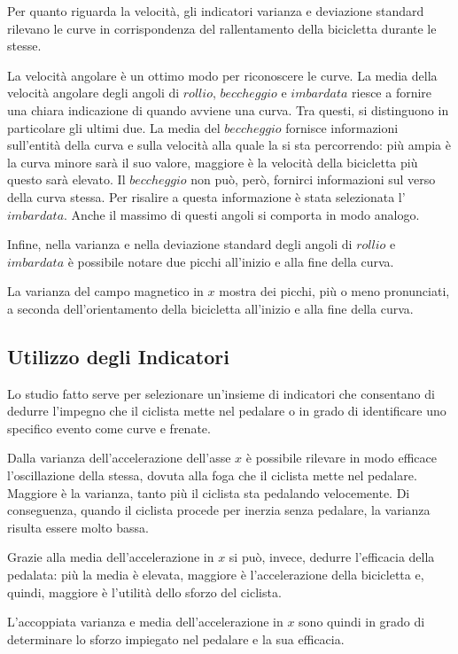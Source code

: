 \documentclass[class=article]{standalone}
\begin{document}
	Per quanto riguarda la velocità, gli indicatori varianza e deviazione standard rilevano le curve in corrispondenza del rallentamento della bicicletta durante le stesse.\hfill\break
	
	La velocità angolare è un ottimo modo per riconoscere le curve. La media della velocità angolare degli angoli di \(rollio\), \(beccheggio\) e \(imbardata\) riesce a fornire una chiara indicazione di quando avviene una curva. Tra questi, si distinguono in particolare gli ultimi due. La media del \(beccheggio\) fornisce informazioni sull'entità della curva e sulla velocità alla quale la si sta percorrendo: più ampia è la curva minore sarà il suo valore, maggiore è la velocità della bicicletta più questo sarà elevato. Il \(beccheggio\) non può, però, fornirci informazioni sul verso della curva stessa. Per risalire a questa informazione è stata selezionata l'\(imbardata\). Anche il massimo di questi angoli si comporta in modo analogo.
	
	Infine, nella varianza e nella deviazione standard degli angoli di \(rollio\) e \(imbardata\) è possibile notare due picchi all'inizio e alla fine della curva.\hfill\break
	
	La varianza del campo magnetico in \(x\) mostra dei picchi, più o meno pronunciati, a seconda dell'orientamento della bicicletta all'inizio e alla fine della curva.
	
	\subsection{Utilizzo degli Indicatori}
	Lo studio fatto serve per selezionare un'insieme di indicatori che consentano di dedurre l'impegno che il ciclista mette nel pedalare o in grado di identificare uno specifico evento come curve e frenate.
	
	Dalla varianza dell'accelerazione dell'asse \(x\) è possibile rilevare in modo efficace l'oscillazione della stessa, dovuta alla foga che il ciclista mette nel pedalare. Maggiore è la varianza, tanto più il ciclista sta pedalando velocemente. Di conseguenza, quando il ciclista procede per inerzia senza pedalare, la varianza risulta essere molto bassa.
	
	Grazie alla media dell'accelerazione in \(x\) si può, invece, dedurre l'efficacia della pedalata: più la media è elevata, maggiore è l'accelerazione della bicicletta e, quindi, maggiore è l'utilità dello sforzo del ciclista.
	
	L'accoppiata varianza e media dell'accelerazione in \(x\) sono quindi in grado di determinare lo sforzo impiegato nel pedalare e la sua efficacia.
	
\end{document}
